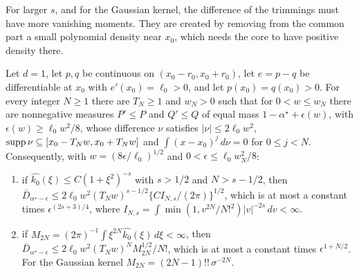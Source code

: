 For larger $s$, and for the Gaussian kernel, the difference of the trimmings must have more vanishing moments. They
are created by removing from the common part a small polynomial density near $x_0$, which needs the core to have
positive density there.

\begin{proposition}
\label{prop:newmoments}
Let $d=1$, let $p,q$ be continuous on $(x_0-r_0,x_0+r_0)$, let $e=p-q$ be differentiable at $x_0$ with
$e'(x_0)=\ell_0>0$, and let $p(x_0)=q(x_0)>0$. For every integer $N\ge1$ there are $T_N\ge1$ and $w_N>0$ such that for
$0<w\le w_N$ there are nonnegative measures $P'\le P$ and $Q'\le Q$ of equal mass $1-\alpha^\star+\epsilon(w)$, with
$\epsilon(w)\ge\ell_0w^2/8$, whose difference $\nu$ satisfies $|\nu|\le2\ell_0w^2$, $\operatorname{supp}\nu\subseteq[x_0-T_Nw,x_0+T_Nw]$ and
$\int(x-x_0)^j\,d\nu=0$ for $0\le j<N$. Consequently, with $w=(8\epsilon/\ell_0)^{1/2}$ and $0<\epsilon\le\ell_0w_N^2/8$:
\begin{enumerate}[label=(\alph*),leftmargin=*]
\item if $\widehat{k_0}(\xi)\le C(1+\xi^2)^{-s}$ with $s>1/2$ and $N>s-1/2$, then
$\bar D_{\alpha^\star-\epsilon}\le2\ell_0w^2(T_Nw)^{s-1/2}\{CI_{N,s}/(2\pi)\}^{1/2}$, which is at most a constant times
$\epsilon^{(2s+3)/4}$, where $I_{N,s}=\int\min(1,v^{2N}/N!^2)|v|^{-2s}\,dv<\infty$.
\item if $M_{2N}=(2\pi)^{-1}\int\xi^{2N}\widehat{k_0}(\xi)\,d\xi<\infty$, then
$\bar D_{\alpha^\star-\epsilon}\le2\ell_0w^2(T_Nw)^NM_{2N}^{1/2}/N!$, which is at most a constant times $\epsilon^{1+N/2}$. For the
Gaussian kernel $M_{2N}=(2N-1)!!\,\sigma^{-2N}$.
\end{enumerate}
\end{proposition}

